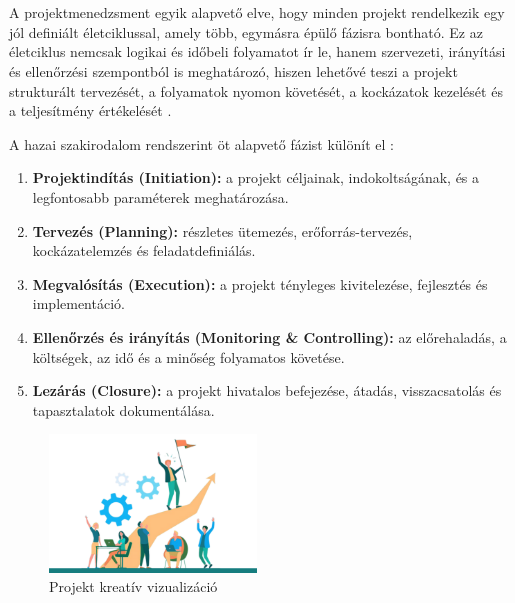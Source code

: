 \chapter{\projectlifecycle}

A projektmenedzsment egyik alapvető elve, hogy minden projekt rendelkezik egy jól definiált életciklussal, 
amely több, egymásra épülő fázisra bontható. 
Ez az életciklus nemcsak logikai és időbeli folyamatot ír le, hanem szervezeti, irányítási és ellenőrzési szempontból is meghatározó, 
hiszen lehetővé teszi a projekt strukturált tervezését, a folyamatok nyomon követését, a kockázatok kezelését és a teljesítmény értékelését \cite{Szalay2018,Hajdu2014,Kaposi2019}. 

A hazai szakirodalom rendszerint öt alapvető fázist különít el \cite{Kovacs2016,Simon2015}:

\begin{enumerate}
    \item \textbf{Projektindítás (Initiation):} a projekt céljainak, indokoltságának, és a legfontosabb paraméterek meghatározása.
    \item \textbf{Tervezés (Planning):} részletes ütemezés, erőforrás-tervezés, kockázatelemzés és feladatdefiniálás.
    \item \textbf{Megvalósítás (Execution):} a projekt tényleges kivitelezése, fejlesztés és implementáció.
    \item \textbf{Ellenőrzés és irányítás (Monitoring \& Controlling):} az előrehaladás, a költségek, az idő és a minőség folyamatos követése.
    \item \textbf{Lezárás (Closure):} a projekt hivatalos befejezése, átadás, visszacsatolás és tapasztalatok dokumentálása.
\end{enumerate}

\begin{figure}[H]
    \centering
    \includegraphics[width=55mm, keepaspectratio]{figures/project_creative.png}
    \caption{Projekt kreatív vizualizáció}
    \label{fig:project_creative}
\end{figure}

